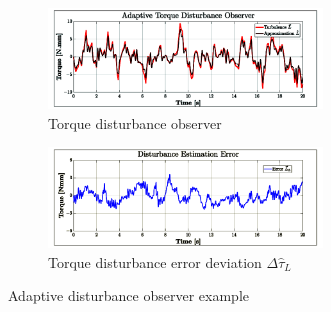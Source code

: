 \begin{figure}[hbtp]
\vspace{-6pt}
\centering
\begin{subfigure}{\textwidth}
\centering
\includegraphics[width=0.8\textwidth]{graphs/disturbance_L}
\vspace{-8pt}
\caption{Torque disturbance observer}
\label{fig:disturbance_L}
\end{subfigure}
\begin{subfigure}{\textwidth}
\centering
\includegraphics[width=0.8\textwidth]{graphs/error_LR}
\vspace{-8pt}
\caption{Torque disturbance error deviation $\Delta\hat{\tau}_L$}
\label{fig:error_LR}
\end{subfigure}
\vspace{-6pt}
\caption{Adaptive disturbance observer example}
\label{fig:example_L}
\vspace{-12pt}
\end{figure}
